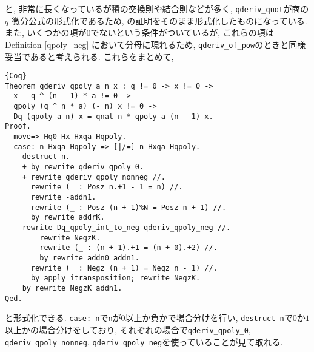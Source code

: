 \documentclass[11pt]{jarticle}
\theoremstyle{mystyle}
\newcommand{\0}{\textbf{0}}
\newcommand{\1}{\textbf{1}}
\newcommand{\2}{\textbf{2}}
\begin{document}
と, 非常に長くなっているが積の交換則や結合則などが多く, {\tt qderiv\_quot}が商の$q$-微分公式の形式化であるため, \cite{Kac}の証明をそのまま形式化したものになっている.  また, いくつかの項が$0$でないという条件がついているが, これらの項は Definition \ref{qpoly_neg} において分母に現れるため, {\tt qderiv\_of\_pow}のときと同様妥当であると考えられる. これらをまとめて, 
\begin{lstlisting}{Coq}
Theorem qderiv_qpoly a n x : q != 0 -> x != 0 ->
  x - q ^ (n - 1) * a != 0 ->
  qpoly (q ^ n * a) (- n) x != 0 ->
  Dq (qpoly a n) x = qnat n * qpoly a (n - 1) x.
Proof.
  move=> Hq0 Hx Hxqa Hqpoly.
  case: n Hxqa Hqpoly => [|/=] n Hxqa Hqpoly.
  - destruct n.
    + by rewrite qderiv_qpoly_0.
    + rewrite qderiv_qpoly_nonneg //.
      rewrite (_ : Posz n.+1 - 1 = n) //.
      rewrite -addn1.
      rewrite (_ : Posz (n + 1)%N = Posz n + 1) //.
      by rewrite addrK.
  - rewrite Dq_qpoly_int_to_neg qderiv_qpoly_neg //.
        rewrite NegzK.
        rewrite (_ : (n + 1).+1 = (n + 0).+2) //.
        by rewrite addn0 addn1.
      rewrite (_ : Negz (n + 1) = Negz n - 1) //.
      by apply itransposition; rewrite NegzK.
    by rewrite NegzK addn1.
Qed.
\end{lstlisting}
と形式化できる. {\tt case:\,n}で{\tt n}が$0$以上か負かで場合分けを行い, {\tt destruct n}で$0$か$1$以上かの場合分けをしており, それぞれの場合で{\tt qderiv\_qpoly\_0}, {\tt qderiv\_qpoly\_nonneg}, {\tt qderiv\_qpoly\_neg}を使っていることが見て取れる. 
\end{document}
